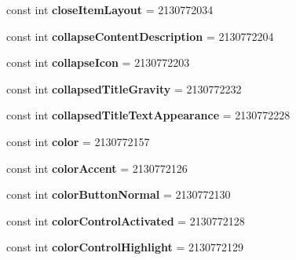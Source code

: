 \begin{DoxyCompactItemize}
const int {\bfseries close\+Item\+Layout} = 2130772034
\item 
\mbox{\label{classXaria_1_1Resource_1_1Attribute_a32ecbceee7c992b652d263de7d3f560d}} 
const int {\bfseries collapse\+Content\+Description} = 2130772204
\item 
\mbox{\label{classXaria_1_1Resource_1_1Attribute_ac20850aa0795322aa7c0eb3e6e7cd0fd}} 
const int {\bfseries collapse\+Icon} = 2130772203
\item 
\mbox{\label{classXaria_1_1Resource_1_1Attribute_a2d0ad87e246ba7f9d29c892a3391fb98}} 
const int {\bfseries collapsed\+Title\+Gravity} = 2130772232
\item 
\mbox{\label{classXaria_1_1Resource_1_1Attribute_a175963f38d376cc728db420e3e16e8b3}} 
const int {\bfseries collapsed\+Title\+Text\+Appearance} = 2130772228
\item 
\mbox{\label{classXaria_1_1Resource_1_1Attribute_a8fca237b0c352f88449d2662780be064}} 
const int {\bfseries color} = 2130772157
\item 
\mbox{\label{classXaria_1_1Resource_1_1Attribute_af091bee53298025eebacea13e738e1ae}} 
const int {\bfseries color\+Accent} = 2130772126
\item 
\mbox{\label{classXaria_1_1Resource_1_1Attribute_ac05c14a0948c4e2ea6a7a96511cd8fca}} 
const int {\bfseries color\+Button\+Normal} = 2130772130
\item 
\mbox{\label{classXaria_1_1Resource_1_1Attribute_afa39a9d2e193ce71b67d63854e91cae0}} 
const int {\bfseries color\+Control\+Activated} = 2130772128
\item 
\mbox{\label{classXaria_1_1Resource_1_1Attribute_afb5ff56826058641accd20f47ac2f4e8}} 
const int {\bfseries color\+Control\+Highlight} = 2130772129
\item 
\mbox{\label{classXaria_1_1Resource_1_1Attribute_a981858c9f8a17dc10ba97e6eea151cb5}} 

\end{DoxyCompactItemize}
